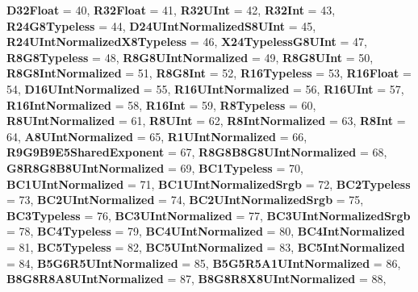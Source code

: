 \begin{DoxyCompactItemize}
{\bfseries D32\+Float} = 40, 
{\bfseries R32\+Float} = 41, 
{\bfseries R32\+U\+Int} = 42, 
{\bfseries R32\+Int} = 43, 
\newline
{\bfseries R24\+G8\+Typeless} = 44, 
{\bfseries D24\+U\+Int\+Normalized\+S8\+U\+Int} = 45, 
{\bfseries R24\+U\+Int\+Normalized\+X8\+Typeless} = 46, 
{\bfseries X24\+Typeless\+G8\+U\+Int} = 47, 
\newline
{\bfseries R8\+G8\+Typeless} = 48, 
{\bfseries R8\+G8\+U\+Int\+Normalized} = 49, 
{\bfseries R8\+G8\+U\+Int} = 50, 
{\bfseries R8\+G8\+Int\+Normalized} = 51, 
\newline
{\bfseries R8\+G8\+Int} = 52, 
{\bfseries R16\+Typeless} = 53, 
{\bfseries R16\+Float} = 54, 
{\bfseries D16\+U\+Int\+Normalized} = 55, 
\newline
{\bfseries R16\+U\+Int\+Normalized} = 56, 
{\bfseries R16\+U\+Int} = 57, 
{\bfseries R16\+Int\+Normalized} = 58, 
{\bfseries R16\+Int} = 59, 
\newline
{\bfseries R8\+Typeless} = 60, 
{\bfseries R8\+U\+Int\+Normalized} = 61, 
{\bfseries R8\+U\+Int} = 62, 
{\bfseries R8\+Int\+Normalized} = 63, 
\newline
{\bfseries R8\+Int} = 64, 
{\bfseries A8\+U\+Int\+Normalized} = 65, 
{\bfseries R1\+U\+Int\+Normalized} = 66, 
{\bfseries R9\+G9\+B9\+E5\+Shared\+Exponent} = 67, 
\newline
{\bfseries R8\+G8\+B8\+G8\+U\+Int\+Normalized} = 68, 
{\bfseries G8\+R8\+G8\+B8\+U\+Int\+Normalized} = 69, 
{\bfseries B\+C1\+Typeless} = 70, 
{\bfseries B\+C1\+U\+Int\+Normalized} = 71, 
\newline
{\bfseries B\+C1\+U\+Int\+Normalized\+Srgb} = 72, 
{\bfseries B\+C2\+Typeless} = 73, 
{\bfseries B\+C2\+U\+Int\+Normalized} = 74, 
{\bfseries B\+C2\+U\+Int\+Normalized\+Srgb} = 75, 
\newline
{\bfseries B\+C3\+Typeless} = 76, 
{\bfseries B\+C3\+U\+Int\+Normalized} = 77, 
{\bfseries B\+C3\+U\+Int\+Normalized\+Srgb} = 78, 
{\bfseries B\+C4\+Typeless} = 79, 
\newline
{\bfseries B\+C4\+U\+Int\+Normalized} = 80, 
{\bfseries B\+C4\+Int\+Normalized} = 81, 
{\bfseries B\+C5\+Typeless} = 82, 
{\bfseries B\+C5\+U\+Int\+Normalized} = 83, 
\newline
{\bfseries B\+C5\+Int\+Normalized} = 84, 
{\bfseries B5\+G6\+R5\+U\+Int\+Normalized} = 85, 
{\bfseries B5\+G5\+R5\+A1\+U\+Int\+Normalized} = 86, 
{\bfseries B8\+G8\+R8\+A8\+U\+Int\+Normalized} = 87, 
\newline
{\bfseries B8\+G8\+R8\+X8\+U\+Int\+Normalized} = 88, 

\end{DoxyCompactItemize}
